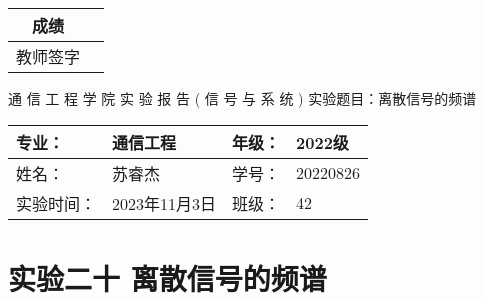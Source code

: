 \documentclass[dvipsnames, svgnames,a4paper,11pt]{article}
\begin{document}
\begin{table}
  \raggedleft
	\renewcommand\arraystretch{1.7}
	\begin{tabular}{|c|p{4em}|}
	\hline
	成绩 &  \\
	\hline
	教师签字 &   \\
	\hline
	\end{tabular}
\end{table}

\begin{center}
	{\kaishu \LARGE   \quad  \quad 通  \quad 信  \quad 工  \quad 程  \quad 学  \quad 院 }
  \newline
  \newline
  \newline
  \newline
  \newline
  {\kaishu \Huge 实 \quad  \quad  \quad 验  \quad  \quad  \quad 报 \quad  \quad  \quad 告}
  \newline
  \newline
  \newline
  \newline
  \newline
  {\songti \Huge  ( \quad  信  \quad 号  \quad 与  \quad 系  \quad 统 \quad)}
  \newline
  \newline
  \newline
  \newline
  \newline
  {\songti  \LARGE 实验题目：离散信号的频谱  \quad  \quad \quad}
\end{center}



\begin{table}[b]
	\renewcommand\arraystretch{1.7}
	\begin{tabularx}{\textwidth}{|X|X|X|X|}
	\hline
	专业：& 通信工程 &年级：& 2022级\\
	\hline
	姓名：& 苏睿杰  & 学号：& 20220826\\
	\hline
	实验时间：& 2023年11月3日 & 班级：& 42 \\
	\hline
	\end{tabularx}
\end{table}



\clearpage
\setcounter{section}{0}
\section{实验二十 \quad 离散信号的频谱}
	
\end{document}
